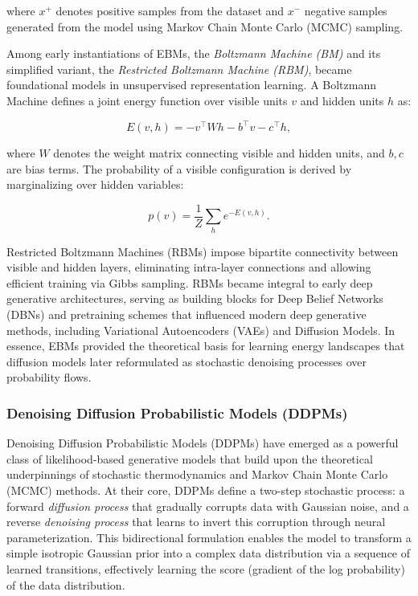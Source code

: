 where \( x^+ \) denotes positive samples from the dataset and \( x^- \) negative samples generated from the model using Markov Chain Monte Carlo (MCMC) sampling.

\vspace{1em}

Among early instantiations of EBMs, the \textit{Boltzmann Machine (BM)} and its simplified variant, the \textit{Restricted Boltzmann Machine (RBM)}, became foundational models in unsupervised representation learning. A Boltzmann Machine defines a joint energy function over visible units \( v \) and hidden units \( h \) as:

\begin{equation}
    E(v, h) = -v^\top W h - b^\top v - c^\top h,
\end{equation}

where \( W \) denotes the weight matrix connecting visible and hidden units, and \( b, c \) are bias terms. The probability of a visible configuration is derived by marginalizing over hidden variables:

\begin{equation}
    p(v) = \frac{1}{Z} \sum_h e^{-E(v, h)}.
\end{equation}

Restricted Boltzmann Machines (RBMs) impose bipartite connectivity between visible and hidden layers, eliminating intra-layer connections and allowing efficient training via Gibbs sampling. RBMs became integral to early deep generative architectures, serving as building blocks for Deep Belief Networks (DBNs) and pretraining schemes that influenced modern deep generative methods, including Variational Autoencoders (VAEs) and Diffusion Models. In essence, EBMs provided the theoretical basis for learning energy landscapes that diffusion models later reformulated as stochastic denoising processes over probability flows.

\vspace{1em}
\subsubsection{Denoising Diffusion Probabilistic Models (DDPMs)}

Denoising Diffusion Probabilistic Models (DDPMs) \cite{ho2020denoising} have emerged as a powerful class of likelihood-based generative models that build upon the theoretical underpinnings of stochastic thermodynamics and Markov Chain Monte Carlo (MCMC) methods. At their core, DDPMs define a two-step stochastic process: a forward \textit{diffusion process} that gradually corrupts data with Gaussian noise, and a reverse \textit{denoising process} that learns to invert this corruption through neural parameterization. This bidirectional formulation enables the model to transform a simple isotropic Gaussian prior into a complex data distribution via a sequence of learned transitions, effectively learning the score (gradient of the log probability) of the data distribution.  

